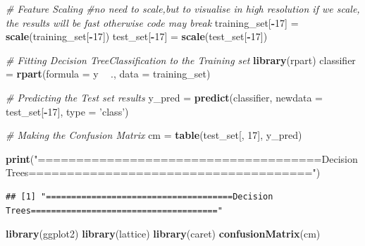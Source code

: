 \documentclass[
]{article}
\newenvironment{Shaded}{\begin{snugshade}}{\end{snugshade}}
\newcommand{\CommentTok}[1]{\textcolor[rgb]{0.56,0.35,0.01}{\textit{#1}}}
\newcommand{\DataTypeTok}[1]{\textcolor[rgb]{0.13,0.29,0.53}{#1}}
\newcommand{\DecValTok}[1]{\textcolor[rgb]{0.00,0.00,0.81}{#1}}
\newcommand{\KeywordTok}[1]{\textcolor[rgb]{0.13,0.29,0.53}{\textbf{#1}}}
\newcommand{\NormalTok}[1]{#1}
\newcommand{\OperatorTok}[1]{\textcolor[rgb]{0.81,0.36,0.00}{\textbf{#1}}}
\newcommand{\StringTok}[1]{\textcolor[rgb]{0.31,0.60,0.02}{#1}}
\begin{document}
\begin{Shaded}
\begin{Highlighting}[]
\CommentTok{# Feature Scaling #no need to scale,but to visualise in high resolution if we scale, the results will be fast otherwise code may break}
\NormalTok{training_set[}\OperatorTok{-}\DecValTok{17}\NormalTok{] =}\StringTok{ }\KeywordTok{scale}\NormalTok{(training_set[}\OperatorTok{-}\DecValTok{17}\NormalTok{])}
\NormalTok{test_set[}\OperatorTok{-}\DecValTok{17}\NormalTok{] =}\StringTok{ }\KeywordTok{scale}\NormalTok{(test_set[}\OperatorTok{-}\DecValTok{17}\NormalTok{])}

\CommentTok{# Fitting Decision TreeClassification to the Training set}
\KeywordTok{library}\NormalTok{(rpart)}
\NormalTok{classifier =}\StringTok{ }\KeywordTok{rpart}\NormalTok{(}\DataTypeTok{formula =}\NormalTok{ y }\OperatorTok{~}\StringTok{ }\NormalTok{.,}
                   \DataTypeTok{data =}\NormalTok{ training_set)}

\CommentTok{# Predicting the Test set results}
\NormalTok{y_pred =}\StringTok{ }\KeywordTok{predict}\NormalTok{(classifier, }\DataTypeTok{newdata =}\NormalTok{ test_set[}\OperatorTok{-}\DecValTok{17}\NormalTok{], }\DataTypeTok{type =} \StringTok{'class'}\NormalTok{) }

\CommentTok{# Making the Confusion Matrix}
\NormalTok{cm =}\StringTok{ }\KeywordTok{table}\NormalTok{(test_set[, }\DecValTok{17}\NormalTok{], y_pred)}

\KeywordTok{print}\NormalTok{(}\StringTok{"=====================================Decision Trees====================================="}\NormalTok{)}
\end{Highlighting}
\end{Shaded}

\begin{verbatim}
## [1] "=====================================Decision Trees====================================="
\end{verbatim}

\begin{Shaded}
\begin{Highlighting}[]
\KeywordTok{library}\NormalTok{(ggplot2)}
\KeywordTok{library}\NormalTok{(lattice)}
\KeywordTok{library}\NormalTok{(caret)}
\KeywordTok{confusionMatrix}\NormalTok{(cm)}
\end{Highlighting}
\end{Shaded}
\end{document}
